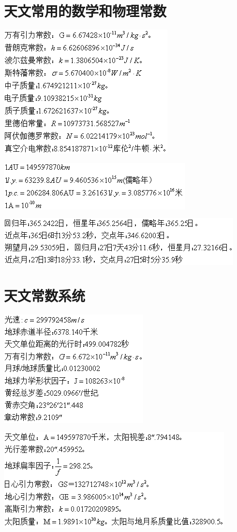 \section{天文常用的数学和物理常数}
\includegraphics{const1.png}

\includegraphics{const2.png}

\includegraphics{const3.png}
\section{天文常数系统}
\includegraphics{const6.png}

\includegraphics{const5.png}
